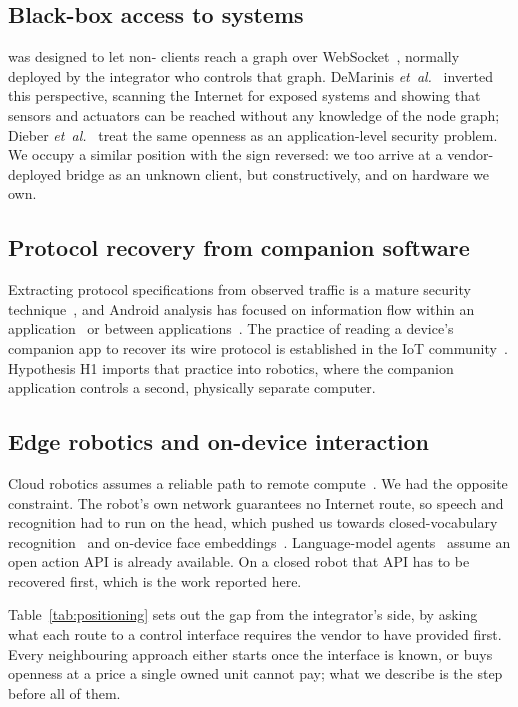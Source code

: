 \subsection{Black-box access to \ros{} systems}
\rosbridge{} was designed to let non-\ros{} clients reach a \ros{} graph over
WebSocket~\cite{crick2012rosbridge,rosbridge_suite}, normally deployed by the integrator who
controls that graph. DeMarinis \emph{et~al.}~\cite{demarinis2019scanning} inverted this
perspective, scanning the Internet for exposed \ros{} systems and showing that sensors and
actuators can be reached without any knowledge of the node graph; Dieber
\emph{et~al.}~\cite{dieber2017security} treat the same openness as an application-level
security problem.
We occupy a similar position with the sign reversed: we too arrive at a vendor-deployed bridge
as an unknown client, but constructively, and on hardware we own.

\subsection{Protocol recovery from companion software}
Extracting protocol specifications from observed traffic is a mature security
technique~\cite{comparetti2009prospex}, and Android analysis has focused on information flow
within an application~\cite{enck2014taintdroid} or between applications~\cite{chin2011android}.
The practice of reading a device's companion app to recover its wire protocol is established in
the IoT community~\cite{giese2018xiaomi}. Hypothesis H1 imports that practice into robotics,
where the companion application controls a second, physically separate computer.

\subsection{Edge robotics and on-device interaction}
Cloud robotics assumes a reliable path to remote compute~\cite{kehoe2015cloud}. We had the
opposite constraint. The robot's own network guarantees no Internet route, so speech and
recognition had to run on the head, which pushed us towards closed-vocabulary
recognition~\cite{warden2018speechcommands,vosk} and on-device face
embeddings~\cite{schroff2015facenet}. Language-model agents~\cite{ahn2022saycan,driess2023paleme}
assume an open action API is already available. On a closed robot that API has to be recovered
first, which is the work reported here.



Table~\ref{tab:positioning} sets out the gap from the integrator's side, by asking what each
route to a control interface requires the vendor to have provided first. Every neighbouring
approach either starts once the interface is known, or buys openness at a price a single owned
unit cannot pay; what we describe is the step before all of them.
